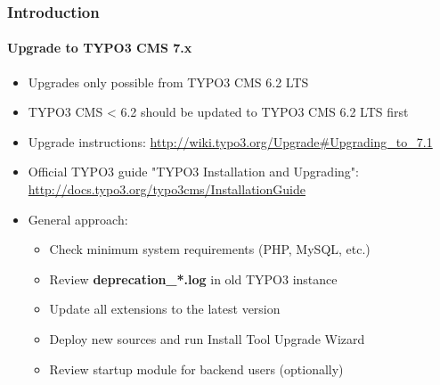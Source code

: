 \begin{frame}[fragile]
	\frametitle{Introduction}
	\framesubtitle{Upgrade to TYPO3 CMS 7.x}

	\begin{itemize}
		\item Upgrades only possible from TYPO3 CMS 6.2 LTS
		\item TYPO3 CMS < 6.2 should be updated to TYPO3 CMS 6.2 LTS first
	\end{itemize}

	\begin{itemize}

		\item Upgrade instructions:\newline
			\smaller\url{http://wiki.typo3.org/Upgrade#Upgrading_to_7.1}\normalsize
		\item Official TYPO3 guide "TYPO3 Installation and Upgrading":
			\smaller\url{http://docs.typo3.org/typo3cms/InstallationGuide}\normalsize
		\item General approach:
			\begin{itemize}
				\item Check minimum system requirements \small(PHP, MySQL, etc.)
				\item Review \textbf{deprecation\_*.log} in old TYPO3 instance
				\item Update all extensions to the latest version
				\item Deploy new sources and run Install Tool \textrightarrow Upgrade Wizard
				\item Review startup module for backend users (optionally)
			\end{itemize}
	\end{itemize}

\end{frame}

